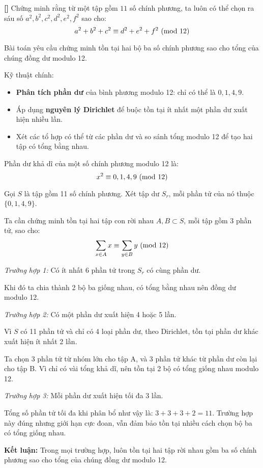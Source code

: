 \documentclass[../01-divisibility.tex]{subfiles}
\begin{document}
\begin{example*}\label{example:IND-2015-N6}\textbf{[]}
	Chứng minh rằng từ một tập gồm \( 11 \) số chính phương, ta luôn có thể chọn ra sáu số \( a^2, b^2, c^2, d^2, e^2, f^2 \) sao cho:
	\[
		a^2 + b^2 + c^2 \equiv d^2 + e^2 + f^2 \ (\mathrm{mod}\ 12)
	\]
\end{example*}

\begin{story*}
	Bài toán yêu cầu chứng minh tồn tại hai bộ ba số chính phương sao cho tổng của chúng đồng dư modulo 12.

	Kỹ thuật chính:
	\begin{itemize}[topsep=0pt, partopsep=0pt, itemsep=0pt]
	    \item \textbf{Phân tích phần dư} của bình phương modulo 12: chỉ có thể là \( 0, 1, 4, 9 \).
	    \item Áp dụng \textbf{nguyên lý Dirichlet} để buộc tồn tại ít nhất một phần dư xuất hiện nhiều lần.
	    \item Xét các tổ hợp có thể từ các phần dư và so sánh tổng modulo 12 để tạo hai tập có tổng bằng nhau.
	\end{itemize}
\end{story*}

\bigbreak

\begin{soln}
	Phần dư khả dĩ của một số chính phương modulo 12 là:
	\[
		x^2 \equiv 0, 1, 4, 9 \ (\mathrm{mod}\ 12)
	\]

	Gọi \( S \) là tập gồm 11 số chính phương. Xét tập dư \( S_r \), mỗi phần tử của nó thuộc \( \{0, 1, 4, 9\} \).

	Ta cần chứng minh tồn tại hai tập con rời nhau \( A, B \subset S \), mỗi tập gồm 3 phần tử, sao cho:
	\[
		\sum_{x \in A} x \equiv \sum_{y \in B} y \ (\mathrm{mod}\ 12)
	\]

	\textit{Trường hợp 1:} Có ít nhất 6 phần tử trong \( S_r \) có cùng phần dư.

	Khi đó ta chia thành 2 bộ ba giống nhau, có tổng bằng nhau nên đồng dư modulo 12.

	\textit{Trường hợp 2:} Có một phần dư xuất hiện 4 hoặc 5 lần.

	Vì \( S \) có 11 phần tử và chỉ có 4 loại phần dư, theo Dirichlet, tồn tại phần dư khác xuất hiện ít nhất 2 lần.

	Ta chọn 3 phần tử từ nhóm lớn cho tập A, và 3 phần tử khác từ phần dư còn lại cho tập B. Vì chỉ có vài tổng khả dĩ, nên tồn tại 2 bộ có tổng giống nhau modulo 12.

	\textit{Trường hợp 3:} Mỗi phần dư xuất hiện tối đa 3 lần.

	Tổng số phần tử tối đa khi phân bổ như vậy là: $3 + 3 + 3 + 2 = 11$.
	Trường hợp này đúng nhưng giới hạn cực đoan, vẫn đảm bảo tồn tại nhiều cách chọn bộ ba có tổng giống nhau.

	\textbf{Kết luận:} Trong mọi trường hợp, luôn tồn tại hai tập rời nhau gồm ba số chính phương sao cho tổng của chúng đồng dư modulo 12.
\end{soln}

\end{document}

